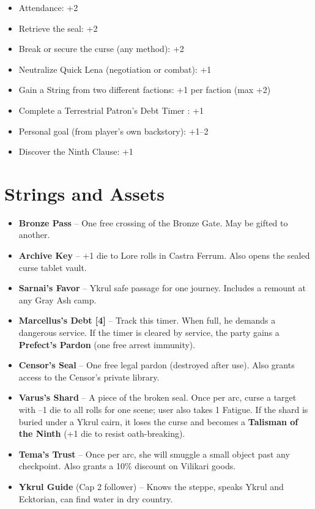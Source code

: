 \documentclass[10pt,twoside]{book}
\begin{document}
\begin{itemize}
\item Attendance: +2
\item Retrieve the seal: +2
\item Break or secure the curse (any method): +2
\item Neutralize Quick Lena (negotiation or combat): +1
\item Gain a String from two different factions: +1 per faction (max +2)
\item Complete a Terrestrial Patron's Debt Timer : +1
\item Personal goal (from player's own backstory): +1--2
\item Discover the Ninth Clause: +1
\end{itemize}

\section{Strings and Assets}

\begin{itemize}
\item \textbf{Bronze Pass} -- One free crossing of the Bronze Gate. May be gifted to another.
\item \textbf{Archive Key} -- +1 die to Lore rolls in Castra Ferrum. Also opens the sealed curse tablet vault.
\item \textbf{Sarnai's Favor} -- Ykrul safe passage for one journey. Includes a remount at any Gray Ash camp.
\item \textbf{Marcellus's Debt [4]} -- Track this timer. When full, he demands a dangerous service. If the timer is cleared by service, the party gains a \textbf{Prefect's Pardon} (one free arrest immunity).
\item \textbf{Censor's Seal} -- One free legal pardon (destroyed after use). Also grants access to the Censor's private library.
\item \textbf{Varus's Shard} -- A piece of the broken seal. Once per arc, curse a target with --1 die to all rolls for one scene; user also takes 1 Fatigue. If the shard is buried under a Ykrul cairn, it loses the curse and becomes a \textbf{Talisman of the Ninth} (+1 die to resist oath-breaking).
\item \textbf{Tema's Trust} -- Once per arc, she will smuggle a small object past any checkpoint. Also grants a 10\% discount on Vilikari goods.
\item \textbf{Ykrul Guide} (Cap 2 follower) -- Knows the steppe, speaks Ykrul and Ecktorian, can find water in dry country.
\end{itemize}
\end{document}
